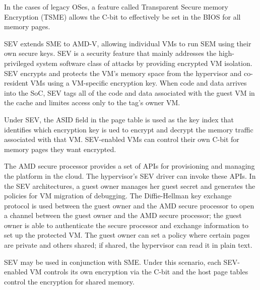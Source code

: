 In the cases of legacy OSes, a feature called Transparent Secure memory
Encryption (TSME) allows the C-bit to effectively be set in the BIOS for all
memory pages.


SEV extends SME to AMD-V, allowing individual VMs to run SEM using their own
secure keys.
%
SEV is a security feature that mainly addresses the high-privileged system
software class of attacks by providing encrypted VM isolation.
%
SEV encrypts and protects the VM's memory space from the hypervisor and
co-resident VMs using a VM-specific encryption key.
%
When code and data arrives into the SoC, SEV tags all of the code and data
associated with the guest VM in the cache and limites access only to the tag's
owner VM.

Under SEV, the ASID field in the page table is used as the key index that
identifies which encryption key is ued to encrypt and decrypt the memory
traffic associated with that VM.
%
SEV-enabled VMs can control their own C-bit for memory pages they want
encrypted.


The AMD secure processor provides a set of APIs for provisioning and managing
the platform in the cloud.
%
The hypervisor's SEV driver can invoke these APIs.
%
In the SEV architectures, a guest owner manages her guest secret and generates
the policies for VM migration of debugging.
%
The Diffie-Hellman key exchange protocol is used between the guest owner and the
AMD secure processor to open a channel between the guest owner and the AMD
secure processor; the guest owner is able to authenticate the secure
processor and exchange information  to set up the protected VM.
%
The guest owner can set a policy where certain pages are private and others
shared; if shared, the hypervisor can read it in plain text.

SEV may be used in conjunction with SME.  Under this scenario, each SEV-enabled
VM controls its own encryption via the C-bit and the host page tables control
the encryption for shared memory.
























